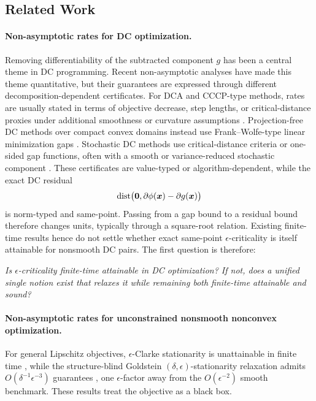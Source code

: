 \subsection{Related Work}
\label{subsec:known-and-open}

\paragraph{Non-asymptotic rates for DC optimization.}

Removing differentiability of the subtracted component $g$ has been a
central theme in DC programming. Recent non-asymptotic analyses have
made this theme quantitative, but their guarantees are expressed through
different decomposition-dependent certificates. For DCA and CCCP-type
methods, rates are usually stated in terms of objective decrease, step
lengths, or critical-distance proxies under additional smoothness or
curvature assumptions
\citep{yurtsever2022cccp,abbaszadehpeivasti2023rate}. Projection-free
DC methods over compact convex domains instead use Frank--Wolfe-type
linear minimization gaps \citep{khamaru2018convergence,maskan2025}.
Stochastic DC methods use critical-distance criteria or one-sided gap
functions, often with a smooth or variance-reduced stochastic component
\citep{xu2019stochastic,le2022stochastic,nguyen2025improved}. These
certificates are value-typed or algorithm-dependent, while the exact DC
residual
\[
    \operatorname{dist}\bigl(\bm{0},\partial\phi(\bm{x})-\partial g(\bm{x})\bigr)
\]
is norm-typed and same-point. Passing from a gap bound to a residual
bound therefore changes units, typically through a square-root relation.
Existing finite-time results hence do not settle whether exact
same-point $\epsilon$-criticality is itself attainable for nonsmooth DC
pairs. The first question is therefore:

\emph{Is $\epsilon$-criticality finite-time attainable in DC
optimization? If not, does a unified single notion exist that relaxes it while
remaining both finite-time attainable and sound?}

\paragraph{Non-asymptotic rates for unconstrained nonsmooth nonconvex
optimization.}
For general Lipschitz objectives, $\epsilon$-Clarke stationarity is
unattainable in finite time \citep{Zhang-2020-Complexity}, while the
structure-blind Goldstein $(\delta,\epsilon)$-stationarity relaxation admits
$O(\delta^{-1}\epsilon^{-3})$ guarantees
\citep{Zhang-2020-Complexity,davis2022gradient},
one $\epsilon$-factor away from the $O(\epsilon^{-2})$ smooth
benchmark. These results treat the objective as a black box. 

